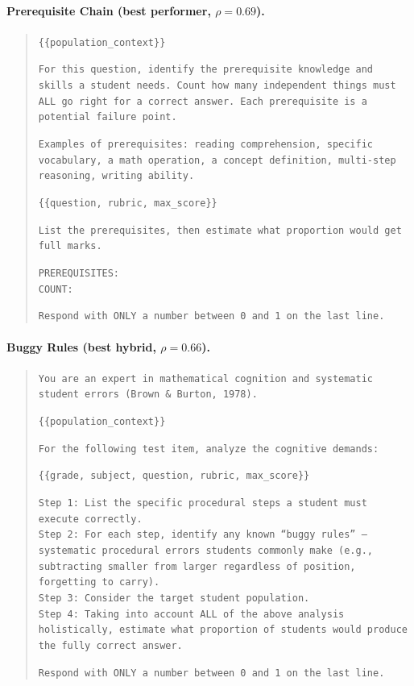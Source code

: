 \documentclass[runningheads]{llncs}
\begin{document}
\paragraph{Prerequisite Chain (best performer, $\rho=0.69$).}
\begin{quote}\small
\texttt{\{\{population\_context\}\}}

\texttt{For this question, identify the prerequisite knowledge and skills a student needs. Count how many independent things must ALL go right for a correct answer. Each prerequisite is a potential failure point.}

\texttt{Examples of prerequisites: reading comprehension, specific vocabulary, a math operation, a concept definition, multi-step reasoning, writing ability.}

\texttt{\{\{question, rubric, max\_score\}\}}

\texttt{List the prerequisites, then estimate what proportion would get full marks.}

\texttt{PREREQUISITES:}\\
\texttt{COUNT:}

\texttt{Respond with ONLY a number between 0 and 1 on the last line.}
\end{quote}

\paragraph{Buggy Rules (best hybrid, $\rho=0.66$).}
\begin{quote}\small
\texttt{You are an expert in mathematical cognition and systematic student errors (Brown \& Burton, 1978).}

\texttt{\{\{population\_context\}\}}

\texttt{For the following test item, analyze the cognitive demands:}

\texttt{\{\{grade, subject, question, rubric, max\_score\}\}}

\texttt{Step 1: List the specific procedural steps a student must execute correctly.}\\
\texttt{Step 2: For each step, identify any known ``buggy rules'' --- systematic procedural errors students commonly make (e.g., subtracting smaller from larger regardless of position, forgetting to carry).}\\
\texttt{Step 3: Consider the target student population.}\\
\texttt{Step 4: Taking into account ALL of the above analysis holistically, estimate what proportion of students would produce the fully correct answer.}

\texttt{Respond with ONLY a number between 0 and 1 on the last line.}
\end{quote}
\end{document}
